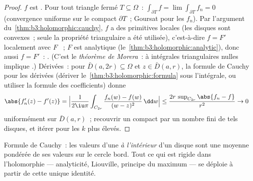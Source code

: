 \begin{proof}
$f$ est . Pour tout triangle fermé $T \subseteq
\Omega$~: $\int_{\partial T}f = \lim\int_{\partial T}f_n = 0$
(convergence uniforme sur le compact $\partial T$~; Goursat
pour les $f_n$). Par l'argument du~\cref{thm:b3:holomorphic:cauchy},
$f$ a des primitives locales (les disques sont convexes~; seule
la propriété triangulaire a été utilisée), c'est-à-dire $f =
F'$ localement avec $F$ ~; $F$ est analytique
(le~\cref{thm:b3:holomorphic:analytic}), donc aussi $f = F'$~:
. (C'est le \emph{théorème de
Morera}~:  à intégrales
triangulaires nulles implique .) Dérivées~: pour
$\bar D(a, 2r) \subseteq \Omega$ et $z \in \bar D(a, r)$,
la formule de Cauchy pour les dérivées (dériver
le~\cref{thm:b3:holomorphic:formula} sous l'intégrale, ou
utiliser la formule des coefficients) donne
\[
\abs{f_n'(z) - f'(z)} =
\Bigl|\frac{1}{2\iu\pi}\int_{C_{2r}}\frac{f_n(w) - f(w)}{(w -
z)^2}\,\dd w\Bigr|
\leq \frac{2r\,\sup_{C_{2r}}\abs{f_n - f}}{r^2} \to 0
\]
uniformément sur $\bar D(a,r)$~; recouvrir un compact par un
nombre fini de tels disques, et itérer pour les $k$ plus
élevés.
\end{proof}

\begin{omfigure}

{\small Formule de Cauchy~: les valeurs d'une  \emph{à l'intérieur} d'un disque sont une moyenne
pondérée de ses valeurs sur le cercle bord. Tout ce qui est
rigide dans l'holomorphie --- analyticité, Liouville, principe
du maximum --- se déploie à partir de cette unique identité.}
\end{omfigure}


